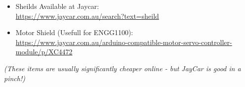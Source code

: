 \documentclass[a4paper,12pt]{report}
\begin{document}
{        
        \vspace{5mm}
        \begin{itemize}
            \item Sheilds Available at Jaycar: \\
                \url{https://www.jaycar.com.au/search?text=sheild}
            \item Motor Shield (Usefull for ENGG1100): \\
            \url{https://www.jaycar.com.au/arduino-compatible-motor-servo-controller-module/p/XC4472}
    
        \end{itemize}
        
        \vspace{1cm}
        \emph{(These items are usually significantly cheaper online - but JayCar is good in a pinch!)}
        
}
\newpage
\end{document}
